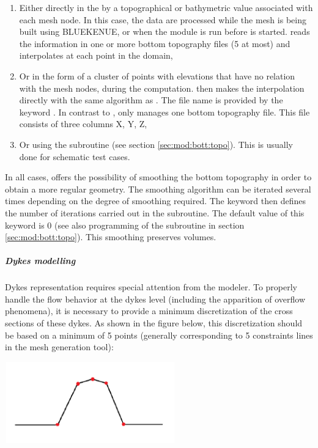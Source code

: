 \begin{enumerate}
\item Either directly in the  by a topographical
or bathymetric value associated with each mesh node.
In this case, the data are processed while the mesh is being built using
BLUEKENUE, or when the \stbtel module is run before  is started.
\stbtel reads the information in one or more bottom topography files (5 at most)
and interpolates at each point in the domain,

\item Or in the form of a cluster of points with elevations that have
no relation with the mesh nodes, during the  computation.
 then makes the interpolation directly with the same algorithm as
\stbtel.
The file name is provided by the keyword .
In contrast to \stbtel,  only manages one bottom topography file.
This file consists of three columns X, Y, Z,

\item Or using the  subroutine (see section
\ref{sec:mod:bott:topo}).
This is usually done for schematic test cases.
\end{enumerate}

In all cases,  offers the possibility of smoothing the bottom
topography in order to obtain a more regular geometry.
The smoothing algorithm can be iterated several times depending on the degree of
smoothing required.
The keyword  then defines the number of iterations
carried out in the  subroutine.
The default value of this keyword is 0 (see also programming of the
 subroutine in section \ref{sec:mod:bott:topo}).
This smoothing preserves volumes.


\subparagraph{Dykes modelling}

Dykes representation requires special attention from the modeler.
To properly handle the flow behavior at the dykes level
(including the apparition of overflow phenomena), it is necessary to provide
a minimum discretization of the cross sections of these dykes.
As shown in the figure below, this discretization should be based on
a minimum of 5 points (generally corresponding to 5 constraints lines in the
mesh generation tool):

\includegraphics*[width=2.91in, height=1.39in, keepaspectratio=false]{./graphics/dyke.png}

